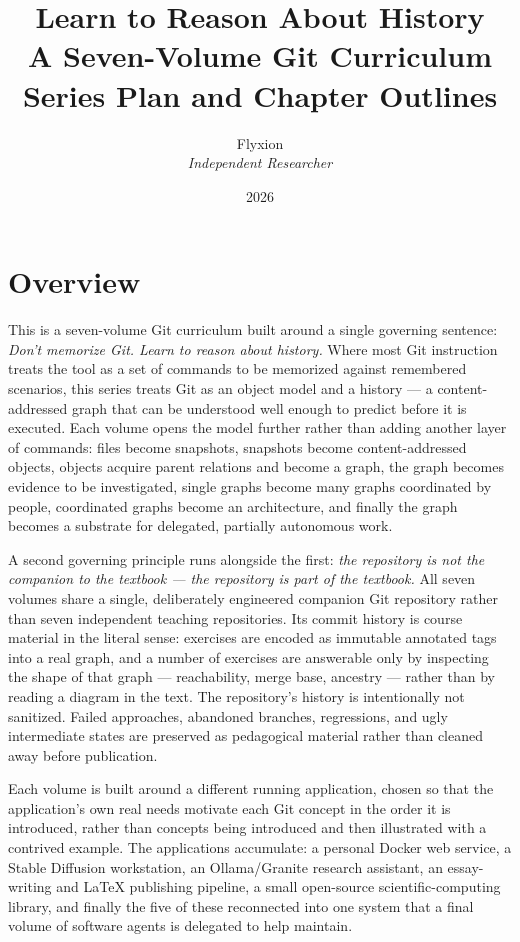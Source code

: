 \documentclass[11pt]{book}
\title{\Huge Learn to Reason About History\\[0.3em]\large A Seven-Volume Git Curriculum\\[0.3em]\normalsize Series Plan and Chapter Outlines}
\author{Flyxion\\\textit{Independent Researcher}}
\date{2026}
\begin{document}
\maketitle

\chapter*{Overview}

This is a seven-volume Git curriculum built around a single governing sentence: \textit{Don't memorize Git. Learn to reason about history.} Where most Git instruction treats the tool as a set of commands to be memorized against remembered scenarios, this series treats Git as an object model and a history — a content-addressed graph that can be understood well enough to predict before it is executed. Each volume opens the model further rather than adding another layer of commands: files become snapshots, snapshots become content-addressed objects, objects acquire parent relations and become a graph, the graph becomes evidence to be investigated, single graphs become many graphs coordinated by people, coordinated graphs become an architecture, and finally the graph becomes a substrate for delegated, partially autonomous work.

A second governing principle runs alongside the first: \textit{the repository is not the companion to the textbook — the repository is part of the textbook.} All seven volumes share a single, deliberately engineered companion Git repository rather than seven independent teaching repositories. Its commit history is course material in the literal sense: exercises are encoded as immutable annotated tags into a real graph, and a number of exercises are answerable only by inspecting the shape of that graph — reachability, merge base, ancestry — rather than by reading a diagram in the text. The repository's history is intentionally not sanitized. Failed approaches, abandoned branches, regressions, and ugly intermediate states are preserved as pedagogical material rather than cleaned away before publication.

Each volume is built around a different running application, chosen so that the application's own real needs motivate each Git concept in the order it is introduced, rather than concepts being introduced and then illustrated with a contrived example. The applications accumulate: a personal Docker web service, a Stable Diffusion workstation, an Ollama/Granite research assistant, an essay-writing and LaTeX publishing pipeline, a small open-source scientific-computing library, and finally the five of these reconnected into one system that a final volume of software agents is delegated to help maintain.
\end{document}
